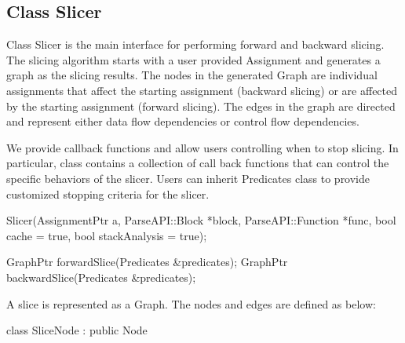 \subsection{Class Slicer}
\label{sec:slicing}


Class Slicer is the main interface for performing forward and backward slicing.
The slicing algorithm starts with a user provided Assignment and generates a
graph as the slicing results. The nodes in the generated Graph are individual
assignments that affect the starting assignment (backward slicing) or are
affected by the starting assignment (forward slicing). The edges in the graph
are directed and represent either data flow dependencies or control flow
dependencies. 

We provide callback functions 
and allow users controlling when to stop slicing. 
In particular, class  contains a collection of call back functions that can
control the specific behaviors of the slicer. Users can inherit Predicates class
to provide customized stopping criteria for the slicer.

\begin{apient}
Slicer(AssignmentPtr a,
       ParseAPI::Block *block,
       ParseAPI::Function *func,
       bool cache = true,
       bool stackAnalysis = true);
\end{apient}

\begin{apient}
GraphPtr forwardSlice(Predicates &predicates);
GraphPtr backwardSlice(Predicates &predicates);
\end{apient}

A slice is represented as a Graph. The nodes and edges are defined as below:

\begin{apient}
class SliceNode : public Node
\end{apient}

